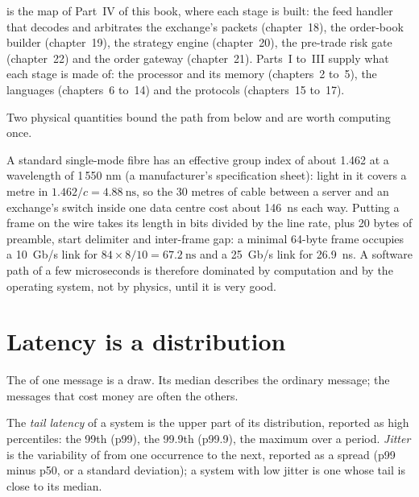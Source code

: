  is the map of Part~IV of this book, where each stage is built:
the feed handler that decodes and arbitrates the exchange's packets (chapter~18), the order-book builder
(chapter~19), the strategy engine (chapter~20), the pre-trade risk gate (chapter~22) and the order gateway
(chapter~21). Parts~I to~III supply what each stage is made of: the processor and its memory (chapters~2 to~5), the
languages (chapters~6 to~14) and the protocols (chapters~15 to~17).

Two physical quantities bound the path from below and are worth computing once.

\begin{example}\label{ex:ll:where-latency-comes-from:physics}
A standard single-mode fibre has an effective group index of about 1.462 at a wavelength of 1\,550 nm (a
manufacturer's specification sheet): light in it covers a metre in $1.462/c = \qty{4.88}{\nano\second}$, so
the 30 metres of cable between a server and an exchange's switch inside one data centre cost about
\qty{146}{\nano\second} each way. Putting a frame on the wire takes its length in bits divided by the line rate,
plus 20 bytes of preamble, start delimiter and inter-frame gap: a minimal 64-byte frame occupies a 10~Gb/s link for
$84 \times 8 / 10 = \qty{67.2}{\nano\second}$ and a 25~Gb/s link for \qty{26.9}{\nano\second}. A software path of a
few microseconds is therefore dominated by computation and by the operating system, not by physics, until it is
very good.
\end{example}

\section{Latency is a distribution}

The  of one message is a draw. Its median describes the ordinary message; the messages that
cost money are often the others.

\begin{definition}\label{def:ll:where-latency-comes-from:tail}
The \emph{tail latency} of a system is the upper part of its  distribution, reported as
high percentiles: the 99th (p99), the 99.9th (p99.9), the maximum over a period. \emph{Jitter} is
the variability of  from one occurrence to the next, reported as a spread (p99 minus p50, or a standard
deviation); a system with low jitter is one whose tail is close to its median.
\end{definition}

